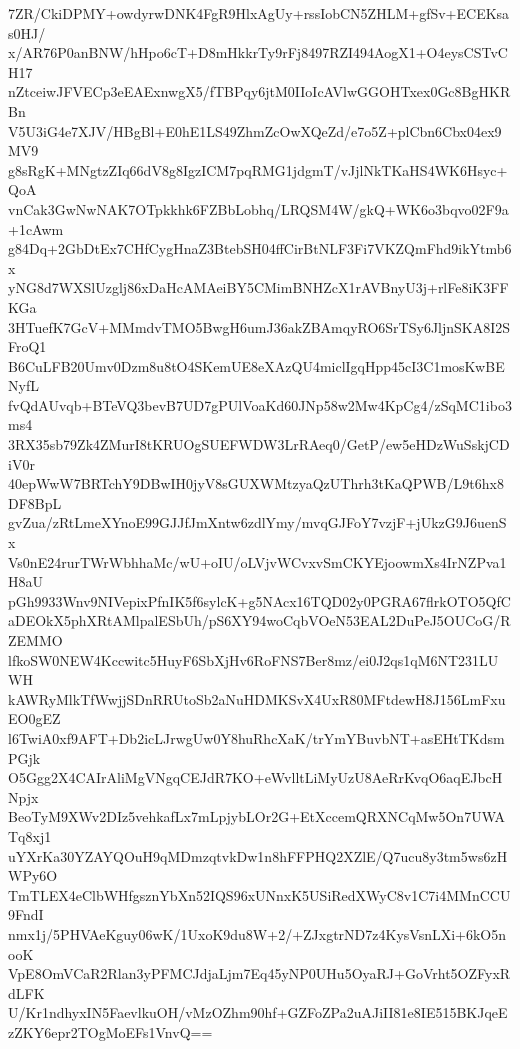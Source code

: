 7ZR/CkiDPMY+owdyrwDNK4FgR9HlxAgUy+rssIobCN5ZHLM+gfSv+ECEKsas0HJ/
x/AR76P0anBNW/hHpo6cT+D8mHkkrTy9rFj8497RZI494AogX1+O4eysCSTvCH17
nZtceiwJFVECp3eEAExnwgX5/fTBPqy6jtM0IIoIcAVlwGGOHTxex0Gc8BgHKRBn
V5U3iG4e7XJV/HBgBl+E0hE1LS49ZhmZcOwXQeZd/e7o5Z+plCbn6Cbx04ex9MV9
g8sRgK+MNgtzZIq66dV8g8IgzICM7pqRMG1jdgmT/vJjlNkTKaHS4WK6Hsyc+QoA
vnCak3GwNwNAK7OTpkkhk6FZBbLobhq/LRQSM4W/gkQ+WK6o3bqvo02F9a+1cAwm
g84Dq+2GbDtEx7CHfCygHnaZ3BtebSH04ffCirBtNLF3Fi7VKZQmFhd9ikYtmb6x
yNG8d7WXSlUzglj86xDaHcAMAeiBY5CMimBNHZcX1rAVBnyU3j+rlFe8iK3FFKGa
3HTuefK7GcV+MMmdvTMO5BwgH6umJ36akZBAmqyRO6SrTSy6JljnSKA8I2SFroQ1
B6CuLFB20Umv0Dzm8u8tO4SKemUE8eXAzQU4miclIgqHpp45cI3C1mosKwBENyfL
fvQdAUvqb+BTeVQ3bevB7UD7gPUlVoaKd60JNp58w2Mw4KpCg4/zSqMC1ibo3ms4
3RX35sb79Zk4ZMurI8tKRUOgSUEFWDW3LrRAeq0/GetP/ew5eHDzWuSskjCDiV0r
40epWwW7BRTchY9DBwIH0jyV8sGUXWMtzyaQzUThrh3tKaQPWB/L9t6hx8DF8BpL
gvZua/zRtLmeXYnoE99GJJfJmXntw6zdlYmy/mvqGJFoY7vzjF+jUkzG9J6uenSx
Vs0nE24rurTWrWbhhaMc/wU+oIU/oLVjvWCvxvSmCKYEjoowmXs4IrNZPva1H8aU
pGh9933Wnv9NIVepixPfnIK5f6sylcK+g5NAcx16TQD02y0PGRA67flrkOTO5QfC
aDEOkX5phXRtAMlpalESbUh/pS6XY94woCqbVOeN53EAL2DuPeJ5OUCoG/RZEMMO
lfkoSW0NEW4Kccwitc5HuyF6SbXjHv6RoFNS7Ber8mz/ei0J2qs1qM6NT231LUWH
kAWRyMlkTfWwjjSDnRRUtoSb2aNuHDMKSvX4UxR80MFtdewH8J156LmFxuEO0gEZ
l6TwiA0xf9AFT+Db2icLJrwgUw0Y8huRhcXaK/trYmYBuvbNT+asEHtTKdsmPGjk
O5Ggg2X4CAIrAliMgVNgqCEJdR7KO+eWvlltLiMyUzU8AeRrKvqO6aqEJbcHNpjx
BeoTyM9XWv2DIz5vehkafLx7mLpjybLOr2G+EtXccemQRXNCqMw5On7UWATq8xj1
uYXrKa30YZAYQOuH9qMDmzqtvkDw1n8hFFPHQ2XZlE/Q7ucu8y3tm5ws6zHWPy6O
TmTLEX4eClbWHfgsznYbXn52IQS96xUNnxK5USiRedXWyC8v1C7i4MMnCCU9FndI
nmx1j/5PHVAeKguy06wK/1UxoK9du8W+2/+ZJxgtrND7z4KysVsnLXi+6kO5nooK
VpE8OmVCaR2Rlan3yPFMCJdjaLjm7Eq45yNP0UHu5OyaRJ+GoVrht5OZFyxRdLFK
U/Kr1ndhyxIN5FaevlkuOH/vMzOZhm90hf+GZFoZPa2uAJiII81e8IE515BKJqeE
zZKY6epr2TOgMoEFs1VnvQ==

